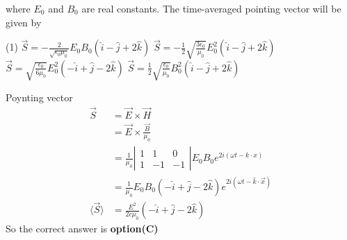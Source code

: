 \begin{questions}
\begin{minipage}{\textwidth}
$$	$$
	where $E_{0}$ and $B_{0}$ are real constants. The time-averaged pointing vector will be given by
\end{minipage}
\begin{tasks}(1)
	\task[\textbf{A.}]   $\vec{S}=-\frac{2}{\sqrt{\epsilon_{0} \mu_{0}}} E_{0} B_{0}(\hat{i}-\hat{j}+2 \hat{k})$
	\task[\textbf{B.}] $\vec{S}=-\frac{1}{2} \sqrt{\frac{3 \epsilon_{0}}{\mu_{0}}} E_{0}^{2}(\hat{i}-\hat{j}+2 \hat{k})$
	\task[\textbf{C.}] $\vec{S}=\sqrt{\frac{\epsilon_{0}}{6 \mu_{0}}} E_{0}^{2}(-\hat{i}+\hat{j}-2 \hat{k})$
	\task[\textbf{D.}] $\vec{S}=\frac{1}{2} \sqrt{\frac{\epsilon_{0}}{\mu_{0}}} B_{0}^{2}(\hat{i}-\hat{j}+2 \hat{k})$
\end{tasks}
\begin{answer}
	Poynting vector
	$$
	\begin{aligned}
	\vec{S} &=\vec{E} \times \vec{H} \\
	&=\vec{E} \times \frac{\vec{B}}{\mu_{0}} \\
	&=\frac{1}{\mu_{0}}\left|\begin{array}{rrr}
	1 & 1 & 0 \\
	1 & -1 & -1
	\end{array}\right| E_{0} B_{0} e^{2 i(\omega t-k \cdot x)} \\
	&=\frac{1}{\mu_{0}} E_{0} B_{0}(-\hat{i}+\hat{j}-2 \hat{k}) e^{2 i(\omega t-\hat{k} \cdot \vec{x})} \\
	\langle\vec{S}\rangle &=\frac{E^{2}}{2 c \mu_{0}}(-\hat{i}+\hat{j}-2 \hat{k})
	\end{aligned}
	$$
	So the correct answer is \textbf{option(C)}
\end{answer}


\end{questions}
